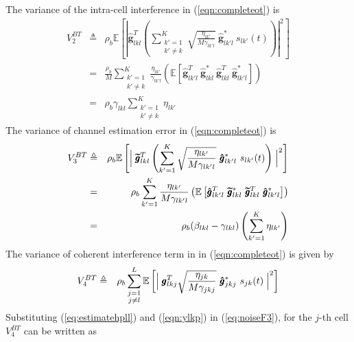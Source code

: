\documentclass[10pt, a4paper, twoside,fleqn]{article}
\begin{document}
The variance of the intra-cell interference in (\ref{eqn:completeot})  is
\begin{eqnarray}\label{eq:noiseF2}
	V_2^{BT} &\triangleq& \rho_b \mathbb{E}\left[\left\vert \pmb{\hat g}^T_{lkl}  \left(\sum_{\substack{k'=1 \\ k' \neq k}}^{K} \sqrt{\frac{\eta_{lk'}}{M\gamma_{lk'l}}} \ \pmb{\hat g}^*_{lk'l} \ s_{lk'} (t)\right)\right\vert^2\right] \nonumber \\
        &=& \frac{\rho_b}{M} \sum_{\substack{k'=1 \\ k' \neq k}}^{K}\frac{\eta_{lk'}}{\gamma_{lk'l}}\left(\mathbb{E}\left[ \pmb{\hat g}^T_{lk'l} \ \pmb{\hat g}^*_{lkl} \ \pmb{\hat g}^T_{lkl} \ \pmb{\hat g}^*_{lk'l} \right]\right) \nonumber \\
	    &=&  \rho_b\gamma_{lkl}\sum\limits_{\substack{k'=1\\ k'\neq k}}^{K}\eta_{lk'}
\end{eqnarray}
The variance of channel estimation error in (\ref{eqn:completeot}) is
\begin{eqnarray}\label{eqn:noiseF4}
	V_3^{BT} &\triangleq& \rho_b \mathbb{E} \left[ \Bigm | \pmb{\widetilde{g}}_{lkl}^T \left(\sum_{k'=1}^{K} \sqrt{\frac{\eta_{lk'}}{M\gamma_{lk'l}}} \ \pmb{\hat g}^*_{lk'l} \ s_{lk'} (t)\right)\Bigm|^2 \right] \nonumber \\
     &=& \rho_b\sum_{k'=1}^{K} \frac{\eta_{lk'}}{M\gamma_{lk'l}} \left(\mathbb{E}\left[\pmb{\hat g}_{lk'l}^T \ \pmb{\widetilde{g}}^*_{lkl} \ \pmb{\widetilde{g}}_{lkl}^T \ \pmb{\hat g}_{lk'l}^{*} \right]\right) \nonumber \\
        &=& \rho_b(\beta_{lkl}-\gamma_{lkl})\left(\sum\limits_{k'=1}^{K}\eta_{lk'}\right)
\end{eqnarray}
The variance of coherent interference term in  in (\ref{eqn:completeot}) is given by
\begin{eqnarray}\label{eq:noiseF3}
	V_4^{BT} &\triangleq& \rho_b \sum_{\substack{j=1 \\ j \neq l}}^{L}\mathbb{E}\left[\Bigm| \pmb{g}_{lkj}^T \sqrt{\frac{\eta_{jk}}{M\gamma_{jkj}}} \ \pmb{\hat g}^*_{jkj} \ s_{jk} (t)\Bigm|^2\right] 
\end{eqnarray}
Substituting (\ref{eq:estimatehpll}) and (\ref{eqn:ylkp}) in (\ref{eq:noiseF3}), for the $j$-th cell $V_4^{BT}$ can be written as
\end{document}
